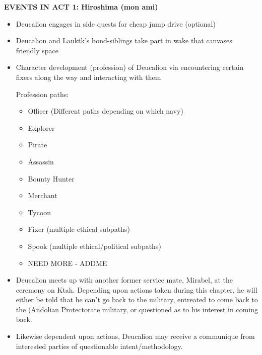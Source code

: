 {\bf EVENTS IN ACT 1: Hiroshima (mon ami)}
\begin{itemize}
\item Deucalion engages in side quests for cheap jump drive (optional)
\item Deucalion and Lauktk's bond-siblings take part in wake that canvases friendly space
\item Character development (profession) of Deucalion via encountering certain fixers along the way and interacting with them

 Profession paths:
\begin{itemize}
\item		Officer (Different paths depending on which navy)
\item		Explorer
\item		Pirate
\item		Assassin
\item		Bounty Hunter
\item		Merchant
\item		Tycoon
\item		Fixer (multiple ethical subpaths)
\item		Spook (multiple ethical/political subpaths)
\item		{NEED MORE - ADDME}
\end{itemize}
\item Deucalion meets up with another former service mate, Mirabel, at
the ceremony on Ktah.  Depending upon actions taken during this
chapter, he will either be told that he can't go back to the military,
entreated to come back to the (Andolian Protectorate military, or
questioned as to his interest in coming back.
\item Likewise dependent upon actions, Deucalion may receive a
communique from interested parties of questionable intent/methodology.
\end{itemize}


